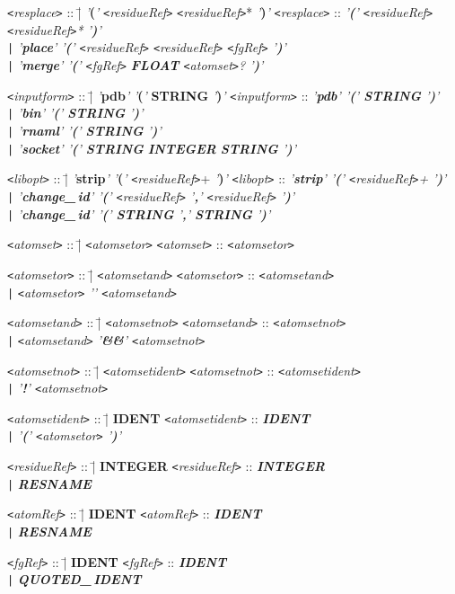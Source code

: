\documentclass[11pt]{article}
\newcommand{\keyword}[1]{{\rm {\tt <}{\em #1}{\tt >}}}
\newcommand{\nonterminal}[1]{{\rm {\tt <}{\em #1}{\tt >}}}
\newcommand{\terminal}[1]{{\em '}{\bf #1}{\em '}}
\newcommand{\token}[1]{{\bf #1}}
\newenvironment{grammarrule}[2]{\begin{tabbing}
    \keyword{#1} :: \= | \= #2 \kill
    \keyword{#1} :: \> \> {\em #2} \\}
  {\end{tabbing}}
\newcommand{\altrule}[1]{\> {\tt |} \> {\em #1} \\}
\begin{document}
\begin{grammarrule}{resplace}{\terminal{(} \nonterminal{residueRef}
    \nonterminal{residueRef}* \terminal{)}}
  \altrule{\terminal{place} \terminal{(} \nonterminal{residueRef}
    \nonterminal{residueRef} \nonterminal{fgRef} \terminal{)}}
  \altrule{\terminal{merge} \terminal{(} \nonterminal{fgRef}
    \token{FLOAT} \nonterminal{atomset}? \terminal{)}}
\end{grammarrule}
\begin{grammarrule}{inputform}{\terminal{pdb} \terminal{(}
    \token{STRING} \terminal{)}}
  \altrule{\terminal{bin} \terminal{(} \token{STRING} \terminal{)}}
  \altrule{\terminal{rnaml} \terminal{(} \token{STRING} \terminal{)}}
  \altrule{\terminal{socket} \terminal{(} \token{STRING}
    \token{INTEGER} \token{STRING} \terminal{)}}
\end{grammarrule}
\begin{grammarrule}{libopt}{\terminal{strip} \terminal{(}
    \nonterminal{residueRef}+ \terminal{)}}
  \altrule{\terminal{change\_\,id} \terminal{(}
    \nonterminal{residueRef} \terminal{,} \nonterminal{residueRef}
    \terminal{)}}
  \altrule{\terminal{change\_\,id} \terminal{(}
    \token{STRING} \terminal{,} \token{STRING} \terminal{)}}
\end{grammarrule}
\begin{grammarrule}{atomset}{\nonterminal{atomsetor}}
\end{grammarrule}
\begin{grammarrule}{atomsetor}{\nonterminal{atomsetand}}
  \altrule{\nonterminal{atomsetor} \terminal{\boldmath{$||$}}
    \nonterminal{atomsetand}}
\end{grammarrule}
\begin{grammarrule}{atomsetand}{\nonterminal{atomsetnot}}
  \altrule{\nonterminal{atomsetand} \terminal{\&\&}
    \nonterminal{atomsetnot}}
\end{grammarrule}
\begin{grammarrule}{atomsetnot}{\nonterminal{atomsetident}}
  \altrule{\terminal{!} \nonterminal{atomsetnot}}
\end{grammarrule}
\begin{grammarrule}{atomsetident}{\token{IDENT}}
  \altrule{\terminal{(} \nonterminal{atomsetor} \terminal{)}}
\end{grammarrule}
\begin{grammarrule}{residueRef}{\token{INTEGER}}
  \altrule{\token{RESNAME}}
\end{grammarrule}
\begin{grammarrule}{atomRef}{\token{IDENT}}
  \altrule{\token{RESNAME}}
\end{grammarrule}
\begin{grammarrule}{fgRef}{\token{IDENT}}
  \altrule{\token{QUOTED\_\,IDENT}}
\end{grammarrule}
\end{document}
